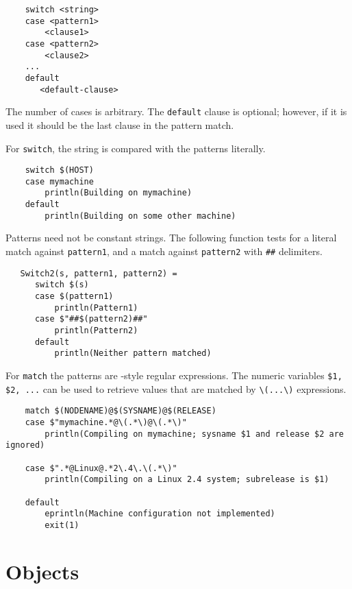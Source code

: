\begin{verbatim}
    switch <string>
    case <pattern1>
        <clause1>
    case <pattern2>
        <clause2>
    ...
    default
       <default-clause>
\end{verbatim}

The number of cases is arbitrary.
The \verb+default+ clause is optional; however, if it is used it should
be the last clause in the pattern match.

For \verb+switch+, the string is compared with the patterns literally.

\begin{verbatim}
    switch $(HOST)
    case mymachine
        println(Building on mymachine)
    default
        println(Building on some other machine)
\end{verbatim}

Patterns need not be constant strings.  The following function tests
for a literal match against \verb+pattern1+, and a match against
\verb+pattern2+ with \verb+##+ delimiters.

\begin{verbatim}
   Switch2(s, pattern1, pattern2) =
      switch $(s)
      case $(pattern1)
          println(Pattern1)
      case $"##$(pattern2)##"
          println(Pattern2)
      default
          println(Neither pattern matched)
\end{verbatim}

For \verb+match+ the patterns are -style regular expressions.
The numeric variables \verb+$1, $2, ...+ can be used to retrieve values
that are matched by \verb+\(...\)+ expressions.

\begin{verbatim}
    match $(NODENAME)@$(SYSNAME)@$(RELEASE)
    case $"mymachine.*@\(.*\)@\(.*\)"
        println(Compiling on mymachine; sysname $1 and release $2 are ignored)

    case $".*@Linux@.*2\.4\.\(.*\)"
        println(Compiling on a Linux 2.4 system; subrelease is $1)

    default
        eprintln(Machine configuration not implemented)
        exit(1)
\end{verbatim}

%
\section{Objects}
\label{section:objects}

